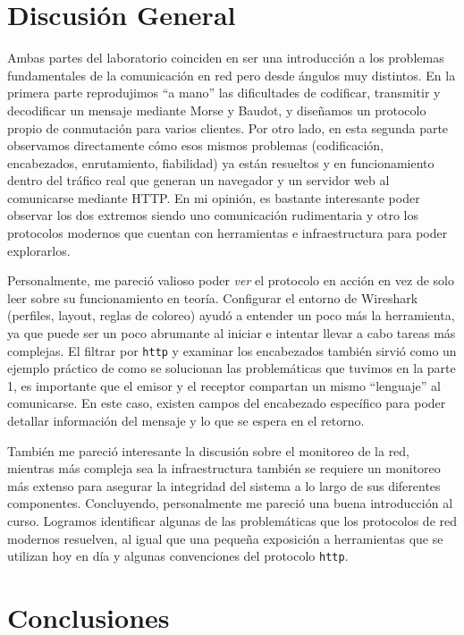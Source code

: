 \documentclass[11pt]{article}
\begin{document}
\section*{Discusión General}

Ambas partes del laboratorio coinciden en ser una introducción a los problemas fundamentales de la comunicación en red pero desde
ángulos muy distintos. En la primera parte reprodujimos ``a mano'' las dificultades de codificar, transmitir y decodificar un mensaje
mediante Morse y Baudot, y diseñamos un protocolo propio de conmutación para varios clientes. Por otro lado, en esta segunda parte observamos
directamente cómo esos mismos problemas (codificación, encabezados, enrutamiento, fiabilidad) ya están resueltos y en funcionamiento dentro del
tráfico real que generan un navegador y un servidor web al comunicarse mediante HTTP. En mi opinión, es bastante interesante poder observar los
dos extremos siendo uno comunicación rudimentaria y otro los protocolos modernos que cuentan con herramientas e infraestructura para poder
explorarlos.

Personalmente, me pareció valioso poder \textit{ver} el protocolo en acción en vez de solo leer sobre su funcionamiento en teoría.
Configurar el entorno de Wireshark (perfiles, layout, reglas de coloreo) ayudó a entender un poco más la herramienta, ya que puede ser un
poco abrumante al iniciar e intentar llevar a cabo tareas más complejas. El filtrar por \texttt{http} y examinar los encabezados también sirvió
como un ejemplo práctico de como se solucionan las problemáticas que tuvimos en la parte 1, es importante que el emisor y el receptor compartan
un mismo ``lenguaje'' al comunicarse. En este caso, existen campos del encabezado específico para poder detallar información del mensaje y lo
que se espera en el retorno.

También me pareció interesante la discusión sobre el monitoreo de la red, mientras más compleja sea la infraestructura también se requiere
un monitoreo más extenso para asegurar la integridad del sistema a lo largo de sus diferentes componentes. Concluyendo, personalmente me pareció
una buena introducción al curso. Logramos identificar algunas de las problemáticas que los protocolos de red modernos resuelven, al igual que una
pequeña exposición a herramientas que se utilizan hoy en día y algunas convenciones del protocolo \texttt{http}.

\section*{Conclusiones}
\end{document}
